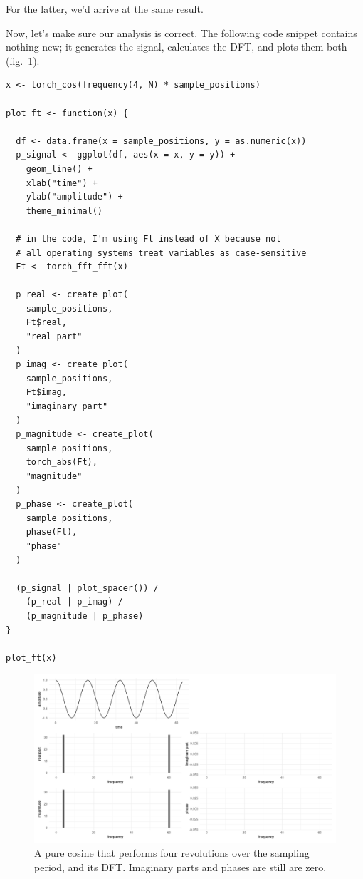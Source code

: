\documentclass[
  letterpaper,
]{krantz}
\begin{document}
For the latter, we'd arrive at the same result.

Now, let's make sure our analysis is correct. The following code snippet
contains nothing new; it generates the signal, calculates the DFT, and
plots them both (fig.~\ref{fig-dft-cos-4-rev}).

\begin{verbatim}
x <- torch_cos(frequency(4, N) * sample_positions)

plot_ft <- function(x) {

  df <- data.frame(x = sample_positions, y = as.numeric(x))
  p_signal <- ggplot(df, aes(x = x, y = y)) +
    geom_line() +
    xlab("time") +
    ylab("amplitude") +
    theme_minimal()

  # in the code, I'm using Ft instead of X because not
  # all operating systems treat variables as case-sensitive
  Ft <- torch_fft_fft(x)

  p_real <- create_plot(
    sample_positions,
    Ft$real,
    "real part"
  )
  p_imag <- create_plot(
    sample_positions,
    Ft$imag,
    "imaginary part"
  )
  p_magnitude <- create_plot(
    sample_positions,
    torch_abs(Ft),
    "magnitude"
  )
  p_phase <- create_plot(
    sample_positions,
    phase(Ft),
    "phase"
  )

  (p_signal | plot_spacer()) /
    (p_real | p_imag) /
    (p_magnitude | p_phase)
}

plot_ft(x)
\end{verbatim}

\begin{figure}[H]

{\centering \includegraphics{images/dft-cos-4-rev.png}

}

\caption{\label{fig-dft-cos-4-rev}A pure cosine that performs four
revolutions over the sampling period, and its DFT. Imaginary parts and
phases are still are zero.}

\end{figure}
\end{document}
